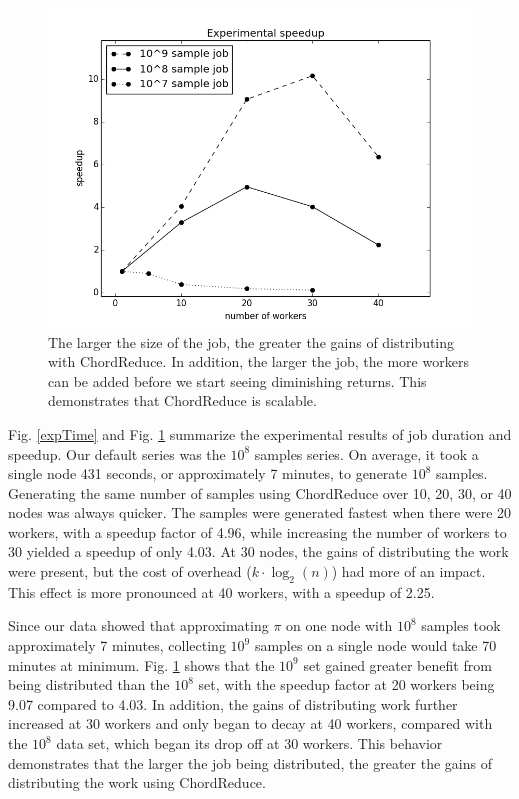 \begin{figure}
    \includegraphics[width=\linewidth]{expSpeed}
    \caption{The larger the size of the job, the greater the gains of distributing with ChordReduce.  In addition, the larger the job, the more workers can be added before we start seeing diminishing returns.  This demonstrates that ChordReduce is scalable.}
    \label{expSpeed}
\end{figure}

Fig. \ref{expTime} and Fig. \ref{expSpeed} summarize the experimental results of job duration and speedup.  Our default series was the $10^{8}$ samples series.  On average, it took a single node 431 seconds, or approximately 7 minutes, to generate $10^{8}$ samples.  Generating the same number of samples using ChordReduce over 10, 20, 30, or 40 nodes was always quicker.  The samples were generated fastest when there were 20 workers, with a speedup factor of 4.96, while increasing the number of workers to 30 yielded a speedup of only 4.03.  At 30 nodes, the gains of distributing the work were present, but the cost of overhead ($k \cdot \log_{2}(n)$) had more of an impact.  This effect is more pronounced at 40 workers, with a speedup of 2.25.

Since our data showed that approximating $\pi$ on one node with $10^{8}$ samples took approximately 7 minutes, collecting $10^{9}$ samples on a single node would take 70 minutes at minimum.  Fig. \ref{expSpeed} shows that the $10^{9}$ set gained greater benefit from being distributed than the $10^{8}$ set, with the speedup factor at 20 workers being 9.07 compared to 4.03.  In addition, the gains of distributing work further increased at 30 workers and only began to decay at 40 workers, compared with the $10^{8}$ data set, which began its drop off at 30 workers. This behavior demonstrates that the larger the job being distributed, the greater the gains of distributing the work using ChordReduce.

